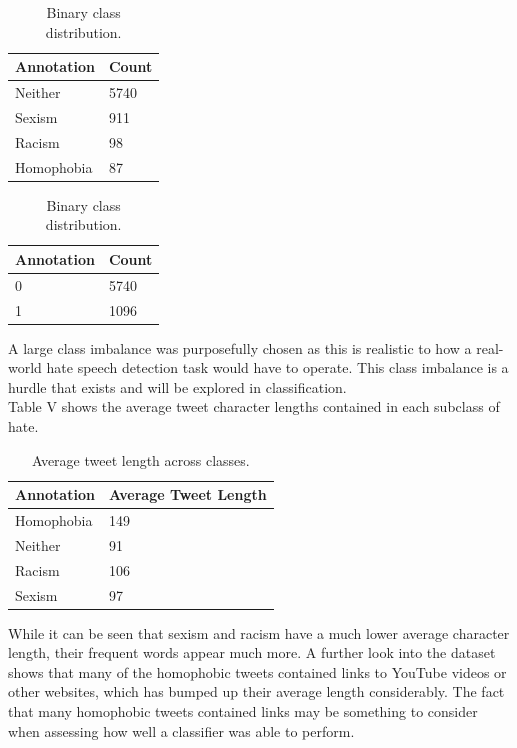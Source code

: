 \documentclass[conference]{IEEEtran}
\begin{document}
\begin{table}[H]
\parbox{.45\linewidth}{
\centering
\begin{tabular}{|l|l|}
\hline
{} Annotation & Count  \\ \hline
Neither    &        5740 \\ \hline
Sexism     &         911 \\ \hline
Racism     &          98 \\ \hline
Homophobia &          87 \\ \hline
\end{tabular}
\caption{\label{tab:multi-class-distribution}Multi-class \\distribution.}
}
\parbox{.45\linewidth}{
\centering
\begin{tabular}{|l|l|}
\hline
{} Annotation & Count  \\ \hline
0    &     5740 \\ \hline
1    &     1096 \\ \hline
\end{tabular}
\caption{\label{tab:binary-class-distribution}Binary class distribution.}
}
\end{table}

A large class imbalance was purposefully chosen as this is realistic to how a real-world hate speech detection task would have to operate. This class imbalance is a hurdle that exists and will be explored in classification.\\

Table V shows the average tweet character lengths contained in each subclass of hate. 

\begin{table}[H]
\centering
\begin{tabular}{|l|l|}
\hline
 Annotation &  Average Tweet Length \\ \hline
 Homophobia &             149  \\ \hline
    Neither &             91  \\ \hline
     Racism &             106  \\ \hline
     Sexism &             97  \\ \hline
\end{tabular}
\caption{\label{tab:tweet-length}Average tweet length across classes.}
\end{table}

While it can be seen that sexism and racism have a much lower average character length, their frequent words appear much more. A further look into the dataset shows that many of the homophobic tweets contained links to YouTube videos or other websites, which has bumped up their average length considerably. The fact that many homophobic tweets contained links may be something to consider when assessing how well a classifier was able to perform. 
\end{document}
